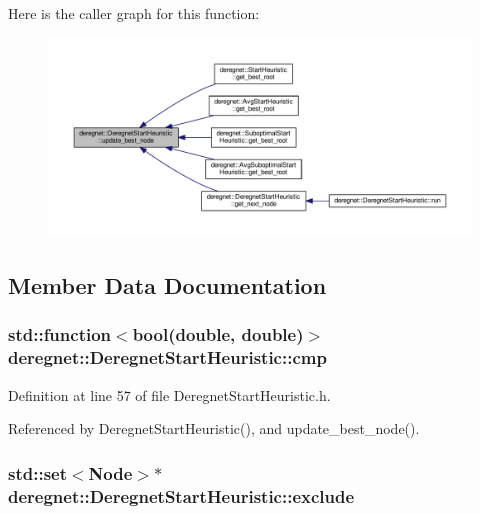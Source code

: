 Here is the caller graph for this function\+:\nopagebreak
\begin{figure}[H]
\begin{center}
\leavevmode
\includegraphics[width=350pt]{classderegnet_1_1DeregnetStartHeuristic_a50179ff9db4d416b93ff41d1dcee1358_icgraph}
\end{center}
\end{figure}




\subsection{Member Data Documentation}
\subsubsection[{\texorpdfstring{cmp}{cmp}}]{\setlength{\rightskip}{0pt plus 5cm}std\+::function$<$bool(double, double)$>$ deregnet\+::\+Deregnet\+Start\+Heuristic\+::cmp\hspace{0.3cm}{\ttfamily [protected]}}\hypertarget{classderegnet_1_1DeregnetStartHeuristic_aa5af4d29e3b276c0046c997c16cca3a1}{}\label{classderegnet_1_1DeregnetStartHeuristic_aa5af4d29e3b276c0046c997c16cca3a1}


Definition at line 57 of file Deregnet\+Start\+Heuristic.\+h.



Referenced by Deregnet\+Start\+Heuristic(), and update\+\_\+best\+\_\+node().

\subsubsection[{\texorpdfstring{exclude}{exclude}}]{\setlength{\rightskip}{0pt plus 5cm}std\+::set$<${\bf Node}$>$$\ast$ deregnet\+::\+Deregnet\+Start\+Heuristic\+::exclude\hspace{0.3cm}{\ttfamily [protected]}}\hypertarget{classderegnet_1_1DeregnetStartHeuristic_aa22c6581cd404bf7ac325850b28dc951}{}\label{classderegnet_1_1DeregnetStartHeuristic_aa22c6581cd404bf7ac325850b28dc951}



